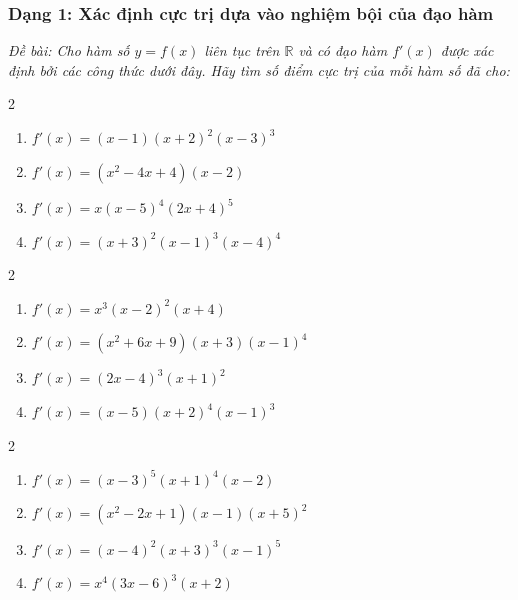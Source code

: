 \documentclass[12pt]{article}
\begin{document}
	\subsubsection{Dạng 1: Xác định cực trị dựa vào nghiệm bội của đạo hàm}
	\textit{Đề bài: Cho hàm số $y = f(x)$ liên tục trên $\mathbb{R}$ và có đạo hàm $f'(x)$ được xác định bởi các công thức dưới đây. Hãy tìm số điểm cực trị của mỗi hàm số đã cho:}
	
	\begin{btxanh}
		\begin{multicols}{2}
			\begin{enumerate}[label=\alph*)]
				\item $f'(x) = (x - 1)(x + 2)^2(x - 3)^3$
				\item $f'(x) = (x^2 - 4x + 4)(x - 2)$
				\item $f'(x) = x(x - 5)^4(2x + 4)^5$
				\item $f'(x) = (x + 3)^2(x - 1)^3(x - 4)^4$
			\end{enumerate}
		\end{multicols}
	\end{btxanh}
	
	\begin{btvang}
		\begin{multicols}{2}
			\begin{enumerate}[label=\alph*)]
				\item $f'(x) = x^3(x - 2)^2(x + 4)$
				\item $f'(x) = (x^2 + 6x + 9)(x + 3)(x - 1)^4$
				\item $f'(x) = (2x - 4)^3(x + 1)^2$
				\item $f'(x) = (x - 5)(x + 2)^4(x - 1)^3$
			\end{enumerate}
		\end{multicols}
	\end{btvang}
	
	\begin{btdo}
		\begin{multicols}{2}
			\begin{enumerate}[label=\alph*)]
				\item $f'(x) = (x - 3)^5(x + 1)^4(x - 2)$
				\item $f'(x) = (x^2 - 2x + 1)(x - 1)(x + 5)^2$
				\item $f'(x) = (x - 4)^2(x + 3)^3(x - 1)^5$
				\item $f'(x) = x^4(3x - 6)^3(x + 2)$
			\end{enumerate}
		\end{multicols}
	\end{btdo}
	
\end{document}
